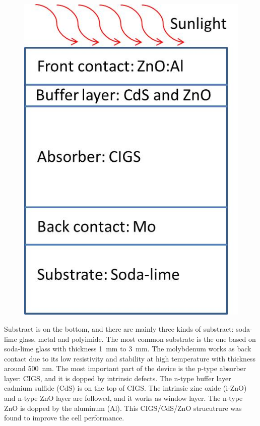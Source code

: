 \documentclass[a4paper, 12pt, titlepage,oneside,drop]{kthesis}
\begin{document}
\begin{figure}[H]
\centering
\includegraphics[scale=0.5]{devicestruc.jpg} 
\caption{}
\label{device}
\end{figure}

Substract is on the bottom, and there are mainly three kinds of substract: soda-lime glass, metal and polyimide. The most common substrate is the one based on soda-lime glass with thickness \SI{1} {\mm} to \SI{3} {\mm}. The molybdenum works as back contact due to its low resistivity and stability at high 
temperature with thickness around \SI{500} {\nm}. The most important part of the device is the p-type absorber layer: CIGS, and it is dopped by intrinsic defects. The n-type buffer layer cadmium sulfide (CdS) is on the top of CIGS.
The intrinsic zinc oxide (i-ZnO) and n-type ZnO layer are followed, and it works as window layer. The n-type ZnO is dopped by the aluminum (Al). This CIGS/CdS/ZnO strucutrure was found to improve the cell performance.
\end{document}
